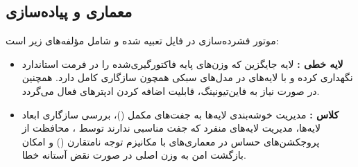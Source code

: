 \subsection{معماری و پیاده‌سازی}
موتور فشرده‌سازی  در فایل  تعبیه شده و شامل مؤلفه‌های زیر است:
\begin{itemize}
    \item \textbf{لایه خطی :} لایه جایگزین که وزن‌های پایه فاکتورگیری‌شده را در فرمت استاندارد نگهداری کرده و با لایه‌های  در مدل‌های سبکی همچون  سازگاری کامل دارد. همچنین در صورت نیاز به فاین‌تیونینگ، قابلیت اضافه کردن ادپترهای  فعال می‌گردد.
    \item \textbf{کلاس :} مدیریت خوشه‌بندی لایه‌ها به جفت‌های مکمل ()، بررسی سازگاری ابعاد لایه‌ها، مدیریت لایه‌های منفرد که جفت مناسبی ندارند توسط ، محافظت از پروجکشن‌های حساس در معماری‌های با مکانیزم توجه نامتقارن () و امکان بازگشت امن به وزن اصلی در صورت نقض آستانه خطا.
\end{itemize}
